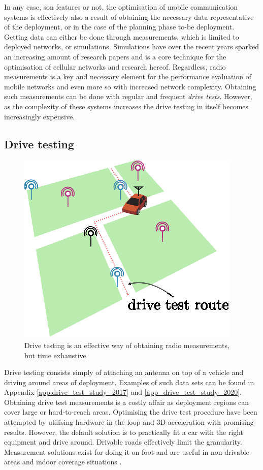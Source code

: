 In any case, \gls{son} features or not, the optimisation of mobile communication systems is effectively also a result of obtaining the necessary data representative of the deployment, or in the case of the planning phase to-be deployment. Getting data can either be done through measurements, which is limited to deployed networks, or simulations. Simulations have over the recent years sparked an increasing amount of research papers and is a core technique for the optimisation of cellular networks and research hereof. Regardless, radio measurements is a key and necessary element for the performance evaluation of mobile networks and even more so with increased network complexity. Obtaining such measurements can be done with regular and frequent \emph{drive tests}. However, as the complexity of these systems increases the drive testing in itself becomes increasingly expensive. 

\subsection{Drive testing}\label{sec:drive_testing}

\begin{figure}
    \centering
    \includegraphics[width=.5\textwidth]{chapters/figures/drive_test_illustration.eps}
    \caption{Drive testing is an effective way of obtaining radio measurements, but time exhaustive}
    \label{fig:my_label}
\end{figure}


Drive testing consists simply of attaching an antenna on top of a vehicle and driving around areas of deployment. Examples of such data sets can be found in Appendix \ref{app:drive_test_study_2017} and \ref{app_drive_test_study_2020}. Obtaining drive test measurements is a costly affair as deployment regions can cover large or hard-to-reach areas. Optimising the drive test procedure have been attempted by utilising hardware in the loop and 3D acceleration \cite{Charitos2017} with promising results. However, the default solution is to practically fit a car with the right equipment and drive around. Drivable roads effectively limit the granularity. Measurement solutions exist for doing it on foot and are useful in non-drivable areas and indoor coverage situations \cite{ROMESmanual}. 

